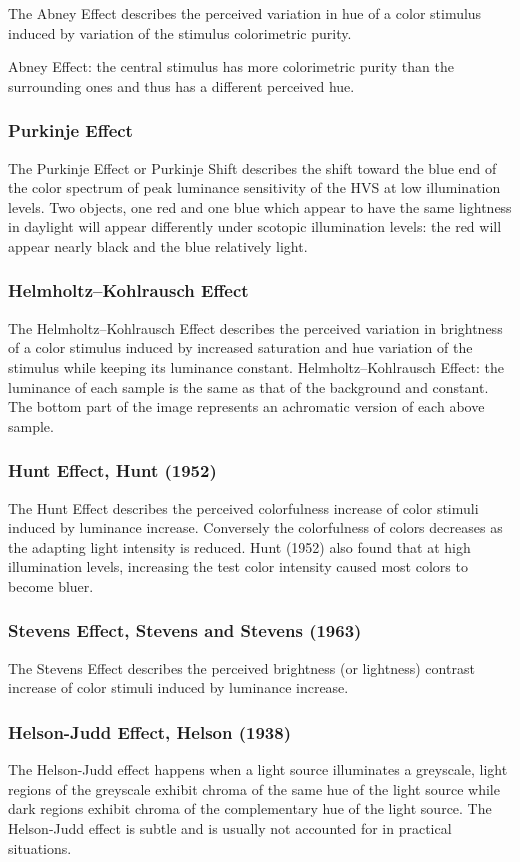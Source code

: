 The Abney Effect describes the perceived variation in hue of a color stimulus induced by variation of the stimulus colorimetric purity.

Abney Effect: the central stimulus has more colorimetric purity than the surrounding ones and thus has a different perceived hue.

\subsubsection{Purkinje Effect}

The Purkinje Effect or Purkinje Shift describes the shift toward the blue end of the color spectrum of peak luminance sensitivity of the HVS at low illumination levels.
Two objects, one red and one blue which appear to have the same lightness in daylight will appear differently under scotopic illumination levels: the red will appear nearly black and the blue relatively light.

\subsubsection{Helmholtz–Kohlrausch Effect}

The Helmholtz–Kohlrausch Effect describes the perceived variation in brightness of a color stimulus induced by increased saturation and hue variation of the stimulus while keeping its luminance constant.
Helmholtz–Kohlrausch Effect: the luminance of each sample is the same as that of the background and constant. The bottom part of the image represents an achromatic version of each above sample.

\subsubsection{Hunt Effect, Hunt (1952)}

The Hunt Effect describes the perceived colorfulness increase of color stimuli induced by luminance increase. Conversely the colorfulness of colors decreases as the adapting light intensity is reduced. 
Hunt (1952) also found that at high illumination levels, increasing the test color intensity caused most colors to become bluer.

\subsubsection{Stevens Effect, Stevens and Stevens (1963)}

The Stevens Effect describes the perceived brightness (or lightness) contrast increase of color stimuli induced by luminance increase.

\subsubsection{Helson-Judd Effect, Helson (1938)}

The Helson-Judd effect happens when a light source illuminates a greyscale, light regions of the greyscale exhibit chroma of the same hue of the light source while dark regions exhibit chroma of the complementary hue of the light source. The Helson-Judd effect is subtle and is usually not accounted for in practical situations.

